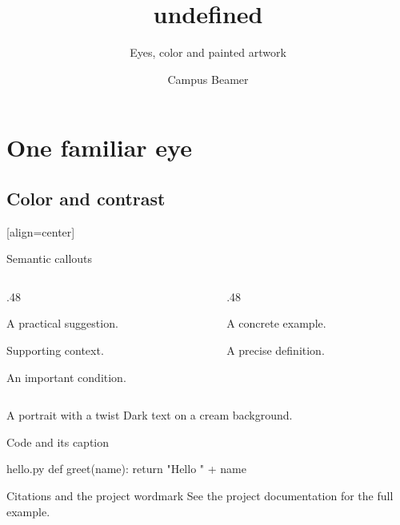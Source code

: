 \documentclass[theme=undefined,language=english,cjk=false]{campusbeamer}
\title{undefined}
\subtitle{Eyes, color and painted artwork}
\author{Campus Beamer}
\date{}
\begin{document}
\maketitle
\section{One familiar eye}
\subsection{Color and contrast}
\sectiontocpage[overview]
[align=center]
\begin{frame}{Semantic callouts}
  \begin{columns}[T,onlytextwidth]
    \begin{column}{.48\textwidth}
      \begin{tipbox}A practical suggestion.\end{tipbox}
      \begin{notebox}Supporting context.\end{notebox}
      \begin{alertbox}An important condition.\end{alertbox}
    \end{column}
    \begin{column}{.48\textwidth}
      \begin{examplebox}A concrete example.\end{examplebox}
      \begin{definitionbox}A precise definition.\end{definitionbox}
    \end{column}
  \end{columns}
\end{frame}
\begin{frame}[campusfocus,campusbackground=theme/undefined/assets/pearl-earring.png,
  campusbackgroundopacity=.15]{A portrait with a twist}
  Dark text on a cream background.
\end{frame}
\begin{frame}[fragile]{Code and its caption}
\begin{campuscode}[language=Python,caption={A minimal greeting.}]{hello.py}
def greet(name):
    return "Hello " + name
\end{campuscode}
\end{frame}
\begin{frame}{Citations and the project wordmark}
  See the project documentation for the full example.
\end{frame}
\backmatter
\end{document}
